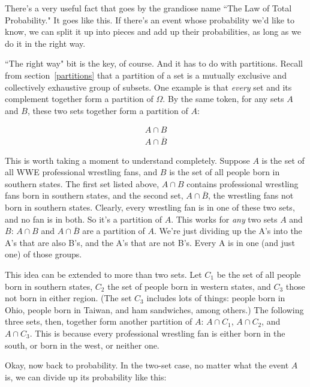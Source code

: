 There's a very useful fact that goes by the grandiose name ``The Law of
Total Probability." It goes like this. If there's an event whose
probability we'd like to know, we can split it up into pieces and add up
their probabilities, as long as we do it in the right way.

``The right way" bit is the key, of course. And it has to do with
partitions. Recall from section~\ref{partitions} that a partition of a set
is a mutually exclusive and collectively exhaustive group of subsets. One
example is that \textit{every} set and its complement together form a
partition of $\Omega$. By the same token, for any sets $A$ and $B$, these
two sets together form a partition of $A$:

\begin{align*}
A \cap B \\
A \cap \overline{B}
\end{align*}

This is worth taking a moment to understand completely. Suppose $A$ is the
set of all WWE professional wrestling fans, and $B$ is the set of all
people born in southern states. The first set listed above, $A \cap B$
contains professional wrestling fans born in southern states, and the
second set, $A \cap \overline{B}$, the wrestling fans not born in southern
states.  Clearly, every wrestling fan is in one of these two sets, and no
fan is in both. So it's a partition of $A$. This works for \textit{any} two
sets $A$ and $B$: $A \cap B$ and $A \cap \overline{B}$ are a partition of
$A$. We're just dividing up the A's into the A's that are also B's, and the
A's that are not B's. Every A is in one (and just one) of those groups.

This idea can be extended to more than two sets. Let $C_1$ be the set of
all people born in southern states, $C_2$ the set of people born in western
states, and $C_3$ those not born in either region. (The set $C_3$ includes
lots of things: people born in Ohio, people born in Taiwan, and ham
sandwiches, among others.) The following three sets, then, together form
another partition of $A$: $A \cap C_1$, $A \cap C_2$, and $A \cap C_3$.
This is because every professional wrestling fan is either born in the
south, or born in the west, or neither one. 

Okay, now back to probability. In the two-set case, no matter what the
event $A$ is, we can divide up its probability like this:

